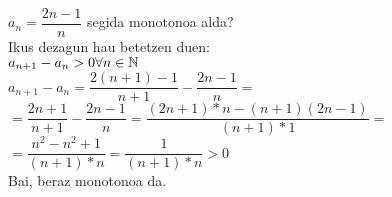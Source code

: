 \begin{adibide}
\item

$a_{n}=\dfrac{2n-1}{n}$ segida monotonoa alda?\\

Ikus dezagun hau betetzen duen:\\

$a_{n+1}-a_{n} > 0   \forall n\in \mathbb N$\\

$a_{n+1}-a_{n}=\dfrac{2(n+1)-1}{n+1}-\dfrac{2n-1}{n}=$\\

$=\dfrac{2n+1}{n+1}-\dfrac{2n-1}{n}=\dfrac{(2n+1)*n-(n+1)(2n-1)}{(n+1)*1}=$\\

$=\dfrac{n^{2}-n^{2}+1}{(n+1)*n}=\dfrac{1}{(n+1)*n} > 0$\\

Bai, beraz monotonoa da.
\end{adibide}
